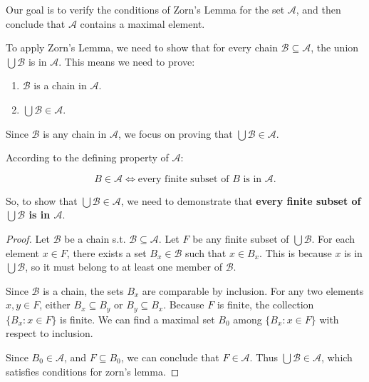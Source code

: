 Our goal is to verify the conditions of Zorn's Lemma for the set \(\mathcal{A}\), and then conclude that \(\mathcal{A}\) contains a maximal element.

To apply Zorn's Lemma, we need to show that for every chain \(\mathcal{B} \subseteq \mathcal{A}\), the union \(\bigcup \mathcal{B}\) is in \(\mathcal{A}\). This means we need to prove:
\begin{enumerate}
    \item \(\mathcal{B}\) is a chain in \(\mathcal{A}\).
    \item \(\bigcup \mathcal{B} \in \mathcal{A}\).
\end{enumerate}

Since \(\mathcal{B}\) is any chain in \(\mathcal{A}\), we focus on proving that \(\bigcup \mathcal{B} \in \mathcal{A}\).

According to the defining property of \(\mathcal{A}\):

\[
B \in \mathcal{A} \iff \text{every finite subset of } B \text{ is in } \mathcal{A}.
\]

So, to show that \(\bigcup \mathcal{B} \in \mathcal{A}\), we need to demonstrate that \textbf{every finite subset of \(\bigcup \mathcal{B}\) is in \(\mathcal{A}\)}.
\begin{proof}
    Let \(\mathcal{B}\) be a chain s.t. \(\mathcal{B} \subseteq \mathcal{A}\). Let \(F\) be any finite subset of \(\bigcup \mathcal{B}\). For each element \(x \in F\), there exists a set \(B_x \in \mathcal{B}\) such that \(x \in B_x\). This is because \(x\) is in \(\bigcup \mathcal{B}\), so it must belong to at least one member of \(\mathcal{B}\).
    
    Since \(\mathcal{B}\) is a chain, the sets \(B_x\) are comparable by inclusion. For any two elements \(x, y \in F\), either \(B_x \subseteq B_y\) or \(B_y \subseteq B_x\). Because \(F\) is finite, the collection \(\{B_x : x \in F\}\) is finite. We can find a maximal set \(B_0\) among \(\{B_x : x \in F\}\) with respect to inclusion. 
    
    Since \(B_0 \in \mathcal{A}\), and \(F \subseteq B_0\), we can conclude that \(F \in \mathcal{A}\). Thus \(\bigcup \mathcal{B} \in \mathcal{A} \), which satisfies conditions for zorn's lemma.
\end{proof}

